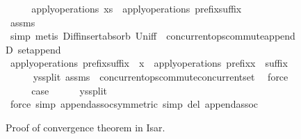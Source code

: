 \begin{figure}[t]
\begin{isabellebody}
\ \ \isamarkupfalse%
\ \isamarkupfalse%
\ {\isachardoublequoteopen}apply{\isacharunderscore}operations\ xs\ {\isacharequal}\ apply{\isacharunderscore}operations\ {\isacharparenleft}prefix{\isacharat}suffix{\isacharparenright}{\isachardoublequoteclose}\isanewline
\ \ \ \ \isamarkupfalse%
\ assms\ \isamarkupfalse%
\ simp\ {\isacharparenleft}metis\ Diff{\isacharunderscore}insert{\isacharunderscore}absorb\ Un{\isacharunderscore}iff\ {\isacharasterisk}\ concurrent{\isacharunderscore}ops{\isacharunderscore}commute{\isacharunderscore}appendD\ set{\isacharunderscore}append{\isacharparenright}\isanewline
\ \ \isamarkupfalse%
\ \isamarkupfalse%
\ {\isachardoublequoteopen}apply{\isacharunderscore}operations\ {\isacharparenleft}prefix{\isacharat}suffix\ {\isacharat}\ {\isacharbrackleft}x{\isacharbrackright}{\isacharparenright}\ {\isacharequal}\ apply{\isacharunderscore}operations\ {\isacharparenleft}prefix{\isacharat}x\ {\isacharhash}\ suffix{\isacharparenright}{\isachardoublequoteclose}\isanewline
\ \ \ \ \isamarkupfalse%
\ ys{\isacharunderscore}split\ assms\ {\isacharasterisk}{\isacharasterisk}\ concurrent{\isacharunderscore}ops{\isacharunderscore}commute{\isacharunderscore}concurrent{\isacharunderscore}set\ \isamarkupfalse%
\ force\isanewline
\ \ \isamarkupfalse%
\ \isamarkupfalse%
\ {\isacharquery}case\isanewline
\ \ \ \ \isamarkupfalse%
\ ys{\isacharunderscore}split\ \isamarkupfalse%
\ {\isacharparenleft}force\ simp{\isacharcolon}\ append{\isacharunderscore}assoc{\isacharbrackleft}symmetric{\isacharbrackright}\ simp\ del{\isacharcolon}\ append{\isacharunderscore}assoc{\isacharparenright}\isanewline
{}\isamarkupfalse%
  \end{isabellebody}
  \caption{Proof of convergence theorem in Isar.}
  \label{fig.convergence}
\end{figure}
